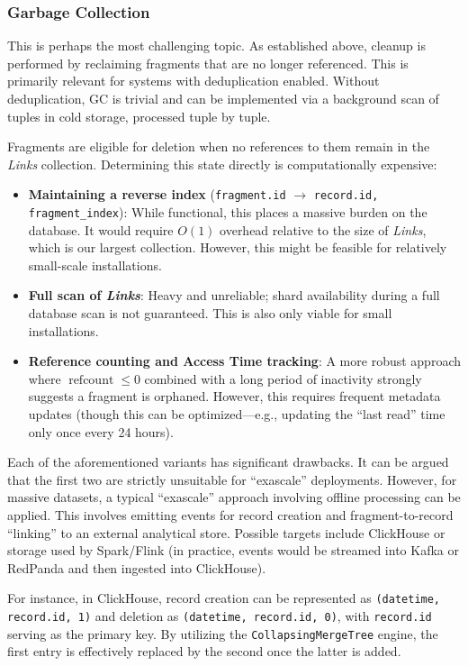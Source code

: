 \documentclass[a4paper,12pt]{article}
\begin{document}
    \subsubsection{Garbage Collection}
    This is perhaps the most challenging topic. As established above, cleanup is performed by reclaiming fragments that are no longer referenced. This is primarily relevant for systems with deduplication enabled. Without deduplication, GC is trivial and can be implemented via a background scan of tuples in cold storage, processed tuple by tuple.

    \smallskip
    Fragments are eligible for deletion when no references to them remain in the \textit{Links} collection. Determining this state directly is computationally expensive:
    \begin{itemize}
        \item \textbf{Maintaining a reverse index} (\texttt{fragment.id} $\rightarrow$ \texttt{record.id, fragment\_index}): While functional, this places a massive burden on the database. It would require $O(1)$ overhead relative to the size of \textit{Links}, which is our largest collection. However, this might be feasible for relatively small-scale installations.
        \item \textbf{Full scan of \textit{Links}}: Heavy and unreliable; shard availability during a full database scan is not guaranteed. This is also only viable for small installations.
        \item \textbf{Reference counting and Access Time tracking}: A more robust approach where $\operatorname{refcount} \leq 0$ combined with a long period of inactivity strongly suggests a fragment is orphaned. However, this requires frequent metadata updates (though this can be optimized—e.g., updating the \enquote{last read} time only once every 24 hours).
    \end{itemize}


    Each of the aforementioned variants has significant drawbacks. It can be argued that the first two are strictly unsuitable for \enquote{exascale} deployments. However, for massive datasets, a typical \enquote{exascale} approach involving offline processing can be applied. This involves emitting events for record creation and fragment-to-record \enquote{linking} to an external analytical store. Possible targets include ClickHouse or storage used by Spark/Flink (in practice, events would be streamed into Kafka or RedPanda and then ingested into ClickHouse).

    \smallskip
    For instance, in ClickHouse, record creation can be represented as \texttt{(datetime, record.id, 1)} and deletion as \texttt{(datetime, record.id, 0)}, with \texttt{record.id} serving as the primary key. By utilizing the \texttt{CollapsingMergeTree} engine, the first entry is effectively replaced by the second once the latter is added.
\end{document}
